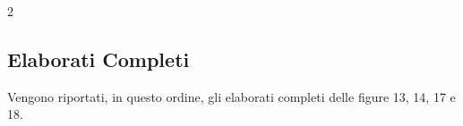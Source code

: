 \documentclass{article}
\begin{document}
\begin{multicols}{2}
\subsection{Elaborati Completi}
Vengono riportati, in questo ordine, gli elaborati completi delle figure 13, 14, 17 e 18.
%
%
%
%

\end{multicols}
\end{document}
